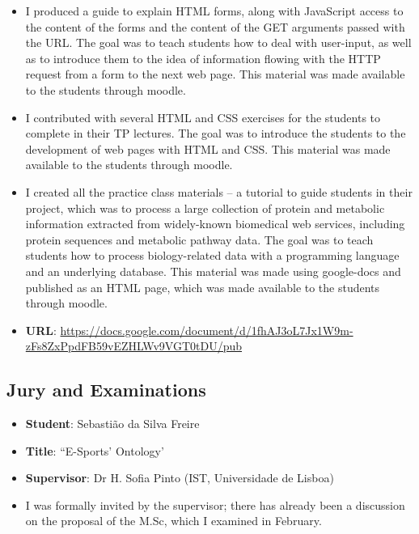\begin{itemize}
    \item I produced a guide to explain HTML forms, along with JavaScript access to the content of the forms and the content of the GET arguments passed with the URL. The goal was to teach students how to deal with user-input, as well as to introduce them to the idea of information flowing with the HTTP request from a form to the next web page. This material was made available to the students through moodle.
\end{itemize}

\begin{itemize}
    \item I contributed with several HTML and CSS exercises for the students to complete in their TP lectures. The goal was to introduce the students to the development of web pages with HTML and CSS. This material was made available to the students through moodle.
\end{itemize}

\begin{itemize}
    \item I created all the practice class materials -- a tutorial to guide students in their project, which was to process a large collection of protein and metabolic information extracted from widely-known biomedical web services, including protein sequences and metabolic pathway data. The goal was to teach students how to process biology-related data with a programming language and an underlying database. This material was made using google-docs and published as an HTML page, which was made available to the students through moodle.
    \item \textbf{URL}: \url{https://docs.google.com/document/d/1fhAJ3oL7Jx1W9m-zFs8ZxPpdFB59vEZHLWv9VGT0tDU/pub}
\end{itemize}


\subsection{Jury and Examinations}

\begin{itemize}
    \item \textbf{Student}: Sebastião da Silva Freire
    \item \textbf{Title}: ``E-Sports' Ontology'
    \item \textbf{Supervisor}: Dr H. Sofia Pinto (IST, Universidade de Lisboa)
    \item I was formally invited by the supervisor; there has already been a discussion on the proposal of the M.Sc, which I examined in February.
\end{itemize}

